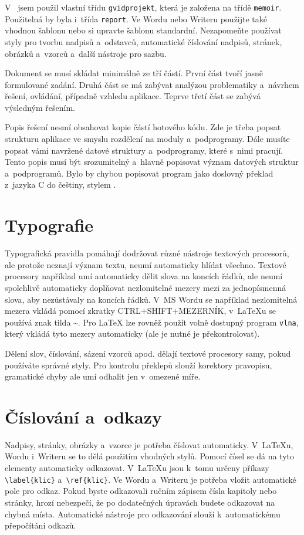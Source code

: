 V~ jsem použil vlastní třídu \verb+gvidprojekt+, která je založena na třídě \verb+memoir+. Použitelná by byla i~třída \verb+report+. Ve Wordu nebo Writeru použijte také vhodnou šablonu nebo si upravte šablonu standardní. Nezapomeňte používat styly pro tvorbu nadpisů a~odstavců, automatické číslování nadpisů, stránek, obrázků a~vzorců a~další nástroje pro sazbu.

\medskip
Dokument se musí skládat minimálně ze tří částí. První část tvoří jasně formulované zadání. Druhá část se má zabývat analýzou problematiky a~návrhem řešení, ovládání, případně vzhledu aplikace. Teprve třetí část se zabývá výsledným řešením.

Popis řešení nesmí obsahovat kopie částí hotového kódu. Zde je třeba popsat strukturu aplikace ve smyslu rozdělení na moduly a~podprogramy. Dále musíte popsat vámi navržené datové struktury a~podprogramy, které s~nimi pracují. Tento popis musí být srozumitelný a~hlavně popisovat význam datových struktur a~podprogramů. Bylo by chybou popisovat program jako doslovný překlad z~jazyka C do češtiny, stylem .

\section{Typografie}
Typografická pravidla pomáhají dodržovat různé nástroje textových procesorů, ale protože neznají význam textu, neumí automaticky hlídat všechno. Textové procesory například umí automaticky dělit slova na koncích řádků, ale neumí spolehlivě automaticky doplňovat nezlomitelné mezery mezi za jednopísmenná slova, aby nezůstávaly na koncích řádků. V~MS Wordu se například nezlomitelná mezera vkládá pomocí zkratky CTRL+SHIFT+MEZERNÍK, v~{\LaTeX}u se používá znak tilda \textasciitilde. Pro {\LaTeX} lze rovněž použít volně dostupný program \verb+vlna+, který vkládá tyto mezery automaticky (ale je nutné je překontrolovat).

Dělení slov, číslování, sázení vzorců apod. dělají textové procesory samy, pokud používáte správné styly. Pro kontrolu překlepů slouží korektory pravopisu, gramatické chyby ale umí odhalit jen v~omezené míře.

\section{Číslování a~odkazy}
Nadpisy, stránky, obrázky a~vzorce je potřeba číslovat automaticky. V~{\LaTeX}u, Wordu i~Writeru se to dělá použitím vhodných stylů. Pomocí čísel se dá na tyto elementy automaticky odkazovat. V~{\LaTeX}u jsou k~tomu určeny příkazy \verb+\label{klic}+ a~\verb+\ref{klic}+. Ve Wordu a~Writeru je potřeba vložit automatické pole pro odkaz. Pokud byste odkazovali ručním zápisem čísla kapitoly nebo stránky, hrozí nebezpečí, že po dodatečných úpravách budete odkazovat na chybná místa. Automatické nástroje pro odkazování slouží k~automatickému přepočítání odkazů.

